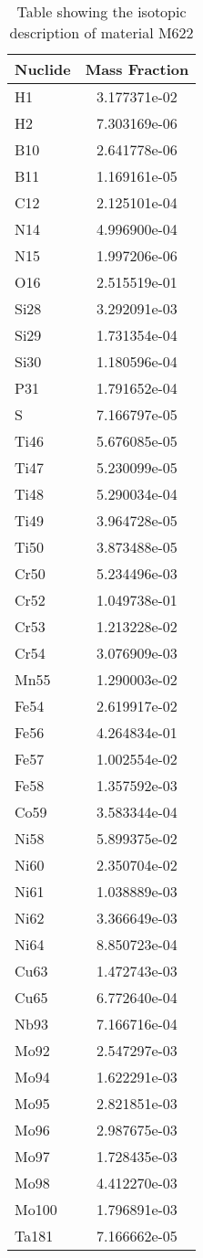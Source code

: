 \begin{centering}
\begin{table}[ht!]
\begin{tabular}{l | c}
\hline
Nuclide & Mass Fraction\\
\hline
H1 & 3.177371e-02\\
H2 & 7.303169e-06\\
B10 & 2.641778e-06\\
B11 & 1.169161e-05\\
C12 & 2.125101e-04\\
N14 & 4.996900e-04\\
N15 & 1.997206e-06\\
O16 & 2.515519e-01\\
Si28 & 3.292091e-03\\
Si29 & 1.731354e-04\\
Si30 & 1.180596e-04\\
P31 & 1.791652e-04\\
S & 7.166797e-05\\
Ti46 & 5.676085e-05\\
Ti47 & 5.230099e-05\\
Ti48 & 5.290034e-04\\
Ti49 & 3.964728e-05\\
Ti50 & 3.873488e-05\\
Cr50 & 5.234496e-03\\
Cr52 & 1.049738e-01\\
Cr53 & 1.213228e-02\\
Cr54 & 3.076909e-03\\
Mn55 & 1.290003e-02\\
Fe54 & 2.619917e-02\\
Fe56 & 4.264834e-01\\
Fe57 & 1.002554e-02\\
Fe58 & 1.357592e-03\\
Co59 & 3.583344e-04\\
Ni58 & 5.899375e-02\\
Ni60 & 2.350704e-02\\
Ni61 & 1.038889e-03\\
Ni62 & 3.366649e-03\\
Ni64 & 8.850723e-04\\
Cu63 & 1.472743e-03\\
Cu65 & 6.772640e-04\\
Nb93 & 7.166716e-04\\
Mo92 & 2.547297e-03\\
Mo94 & 1.622291e-03\\
Mo95 & 2.821851e-03\\
Mo96 & 2.987675e-03\\
Mo97 & 1.728435e-03\\
Mo98 & 4.412270e-03\\
Mo100 & 1.796891e-03\\
Ta181 & 7.166662e-05
\end{tabular}
\caption{Table showing the isotopic description of material M622}
\label{table:material_M622}
\end{table}\clearpage


\end{centering}
